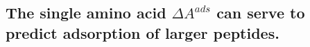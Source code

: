 \documentclass[journal=jcisd8,manuscript=article,layout=twocolumn]{achemso}
\begin{document}

\subsection{The single amino acid $\Delta A^{ads}$ can serve to predict adsorption of larger peptides.}
\end{document}
